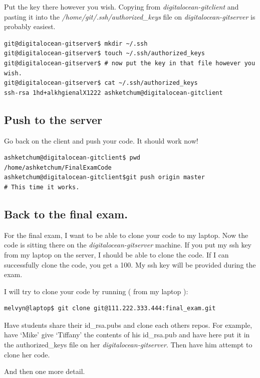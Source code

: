 \documentclass[10pt]{article}
\begin{document}
Put the key there however you wish. Copying from \textit{digitalocean-gitclient} and pasting it into the
\textit{/home/git/.ssh/authorized\_keys} file on \textit{digitalocean-gitserver} is probably easiest.

\begin{lstlisting}
git@digitalocean-gitserver$ mkdir ~/.ssh
git@digitalocean-gitserver$ touch ~/.ssh/authorized_keys
git@digitalocean-gitserver$ # now put the key in that file however you wish.
git@digitalocean-gitserver$ cat ~/.ssh/authorized_keys
ssh-rsa 1hd+alkhgienalX1222 ashketchum@digitalocean-gitclient
\end{lstlisting}

\subsection{Push to the server}
Go back on the client and push your code. It should work now!

\begin{lstlisting}
ashketchum@digitalocean-gitclient$ pwd
/home/ashketchum/FinalExamCode
ashketchum@digitalocean-gitclient$git push origin master
# This time it works.
\end{lstlisting}

\subsection{Back to the final exam.}
For the final exam, I want to be able to clone your code to my laptop. Now the
code is sitting there on the \textit{digitalocean-gitserver} machine. If you put
my ssh key from my laptop on the server, I should be able to clone the code. If
I can successfully clone the code, you get a 100. My ssh key will be provided
during the exam. 

I will try to clone your code by running ( from my laptop ):
\begin{lstlisting}
melvyn@laptop$ git clone git@111.222.333.444:final_exam.git
\end{lstlisting}

\begin{center}
{\LARGE Have students share their id\_rsa.pubs and clone each others repos. For
example, have `Mike' give `Tiffany' the contents of his id\_rsa.pub and have
here put it in the authorized\_keys file on her \textit{digitalocean-gitserver}}.
Then have him attempt to clone her code.
\end{center}

And then one more detail.
\end{document}
